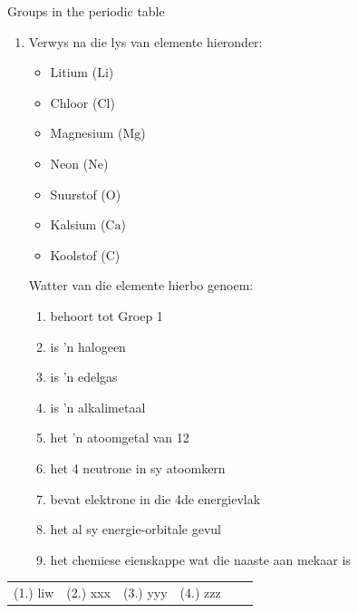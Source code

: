 \begin{exercises}{Groups in the periodic table}
{\begin{enumerate}[noitemsep, label=\textbf{\arabic*}. ]
\item            \label{m38760*id262476}Verwys na die lys van elemente hieronder: \label{m38760*id7632}\begin{itemize}[noitemsep]
            \item Litium ($\mathrm{Li}$)\item Chloor ($\mathrm{Cl}$)\item Magnesium ($\mathrm{Mg}$)\item Neon ($\mathrm{Ne}$)\item Suurstof ($\mathrm{O}$)\item Kalsium ($\mathrm{Ca}$)\item Koolstof ($\mathrm{C}$)\end{itemize}
        Watter van die elemente hierbo genoem:
        \label{m38760*id262499}\begin{enumerate}[noitemsep, label=\textbf{\alph*}. ] 
            \label{m38760*uid158}\item behoort tot Groep 1
\label{m38760*uid159}\item is 'n halogeen
\label{m38760*uid160}\item is 'n edelgas
\label{m38760*uid161}\item is 'n alkalimetaal
\label{m38760*uid162}\item het 'n atoomgetal van 12
\label{m38760*uid163}\item het 4 neutrone in sy atoomkern
\label{m38760*uid164}\item bevat elektrone in die 4de energievlak
\label{m38760*uid166}\item het al sy energie-orbitale gevul
\label{m38760*uid167}\item het chemiese eienskappe wat die naaste aan mekaar is
\end{enumerate}
\end{enumerate}

\practiceinfo
 \par \begin{tabular}[h]{cccccc}
 (1.) liw  & (2.) xxx & (3.) yyy & (4.) zzz \end{tabular}
}
\end{exercises}
